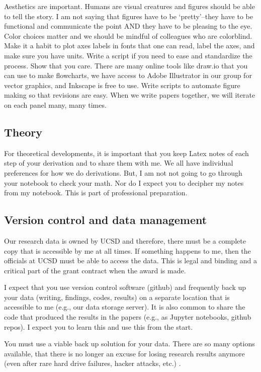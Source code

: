 \documentclass[12pt]{article}
\begin{document}
Aesthetics are important.
Humans are visual creatures and figures should be able to tell the story.
I am not saying that figures have to be `pretty'--they have to be functional and communicate the point AND they have to be pleasing to the eye.
Color choices matter and we should be mindful of colleagues who are colorblind.
Make it a habit to plot axes labels in fonts that one can read, label the axes, and make sure you have units.
Write a script if you need to ease and standardize the process.
Show that you care.
There are many online tools like draw.io that you can use to make flowcharts, we have access to Adobe Illustrator in our group for vector graphics, and Inkscape is free to use.
Write scripts to automate figure making so that revisions are easy.
When we write papers together, we will iterate on each panel many, many times.

\subsection{Theory}

For theoretical developments, it is important that you keep Latex notes of each step of your derivation and to share them with me.
We all have individual preferences for how we do derivations.
But, I am not not going to go through your notebook to check your math.
Nor do I expect you to decipher my notes from my notebook.
This is part of professional preparation.


\subsection{Version control and data management}
Our research data is owned by UCSD and therefore, there must be a complete copy that is accessible by me at all times.
If something happens to me, then the officials at UCSD must be able to access the data.
This is legal and binding and a critical part of the grant contract when the award is made.

I expect that you use version control software (github) and frequently back up your data (writing, findings, codes, results) on a separate location that is accessible to me (e.g., our data storage server).
It is also common to share the code that produced the results in the papers (e.g., as Jupyter notebooks, github repos).
I expect you to learn this and use this from the start.

You must use a viable back up solution for your data.
There are so many options available, that there is no longer an excuse for losing research results anymore (even after rare hard drive failures, hacker attacks, etc.)
.
\end{document}
